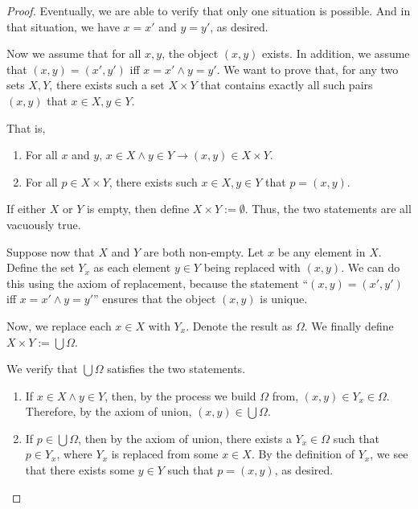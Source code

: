 \begin{proof}
	Eventually, we are able to verify that only one situation is possible. And in that situation, we have $x = x'$ and $y = y'$, as desired.
	
	 Now we assume that for all $x,y$, the object $(x,y)$ exists. In addition, we assume that $(x,y) = (x',y')$ iff $x = x' \wedge y = y'$. We want to prove that, for any two sets $X,Y$, there exists such a set $X \times Y$ that contains exactly all such pairs $(x,y)$ that $x \in X, y \in Y$.
	
	That is,
	\begin{enumerate}
		\item For all $x$ and $y$, $x \in X \wedge y \in Y \to (x,y) \in X \times Y$.
		\item For all $p \in X \times Y$, there exists such $x \in X, y \in Y$ that $p = (x,y)$.
	\end{enumerate}

	If either $X$ or $Y$ is empty, then define $X \times Y := \emptyset$. Thus, the two statements are all vacuously true.
	
	Suppose now that $X$ and $Y$ are both non-empty. Let $x$ be any element in $X$. Define the set $Y_x$ as each element $y \in Y$ being replaced with $(x,y)$. We can do this using the axiom of replacement, because the statement ``$(x,y) = (x',y')$ iff $x = x' \wedge y = y'$'' ensures that the object $(x,y)$ is unique.
	
	Now, we replace each $x \in X$ with $Y_x$. Denote the result as $\Omega$. We finally define $X\times Y := \bigcup \Omega$. 
	
	We verify that $\bigcup \Omega$ satisfies the two statements.
	\begin{enumerate}
		\item If $x \in X \wedge y \in Y$, then, by the process we build $\Omega$ from, $(x,y) \in Y_x \in \Omega$. Therefore, by the axiom of union, $(x,y) \in \bigcup \Omega$.
		\item If $p \in \bigcup \Omega$, then by the axiom of union, there exists a $Y_x \in \Omega$ such that $p \in Y_x$, where $Y_x$ is replaced from some $x \in X$. By the definition of $Y_x$, we see that there exists some $y \in Y$ such that $p = (x,y)$, as desired.
	\end{enumerate}
\end{proof}

